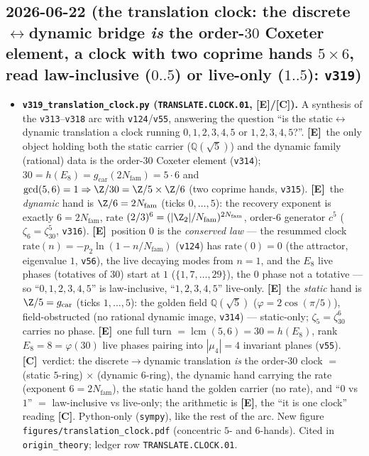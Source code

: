 \documentclass[11pt]{article}
\providecommand{\mE}{\textbf{[E]}}\providecommand{\mC}{\textbf{[C]}}
\providecommand{\gcar}{g_{\mathrm{car}}}\providecommand{\Nfam}{N_{\mathrm{fam}}}
\begin{document}
\subsection*{2026-06-22 (the translation clock: the discrete$\leftrightarrow$dynamic bridge \emph{is} the order-$30$ Coxeter element, a clock with two coprime hands $5\times6$, read law-inclusive ($0..5$) or live-only ($1..5$): \texttt{v319})}
\begin{itemize}
\item \textbf{\texttt{v319\_translation\_clock.py} (\texttt{TRANSLATE.CLOCK.01}, \mE/\mC).} A synthesis of the
  \texttt{v313}--\texttt{v318} arc with \texttt{v124}/\texttt{v55}, answering the question ``is the
  static$\leftrightarrow$dynamic translation a clock running $0,1,2,3,4,5$ or $1,2,3,4,5$?''. \mE\ the only object
  holding both the static carrier ($\mathbb Q(\sqrt5)$) and the dynamic family (rational) data is the order-$30$
  Coxeter element (\texttt{v314}); $30=h(E_8)=\gcar(2\Nfam)=5\cdot6$ and $\gcd(5,6)=1\Rightarrow\Z/30=\Z/5\times\Z/6$
  (two coprime hands, \texttt{v315}). \mE\ the \emph{dynamic} hand is $\Z/6=2\Nfam$ (ticks $0,\dots,5$): the recovery
  exponent is exactly $6=2\Nfam$, rate $(2/3)^6=(|\Z_2|/\Nfam)^{2\Nfam}$, order-$6$ generator $c^5$
  ($\zeta_6=\zeta_{30}^5$, \texttt{v316}). \mE\ position $0$ is the \emph{conserved law} --- the resummed clock
  $\mathrm{rate}(n)=-p_2\ln(1-n/\Nfam)$ (\texttt{v124}) has $\mathrm{rate}(0)=0$ (the attractor, eigenvalue $1$,
  \texttt{v56}), the live decaying modes from $n{=}1$, and the $E_8$ live phases (totatives of $30$) start at $1$
  ($\{1,7,\dots,29\}$), the $0$ phase not a totative --- so ``$0,1,2,3,4,5$'' is law-inclusive, ``$1,2,3,4,5$''
  live-only. \mE\ the \emph{static} hand is $\Z/5=\gcar$ (ticks $1,\dots,5$): the golden field $\mathbb Q(\sqrt5)$
  ($\varphi=2\cos(\pi/5)$), field-obstructed (no rational dynamic image, \texttt{v314}) --- static-only;
  $\zeta_5=\zeta_{30}^6$ carries no phase. \mE\ one full turn $=\operatorname{lcm}(5,6)=30=h(E_8)$, rank
  $E_8=8=\varphi(30)$ live phases pairing into $|\mu_4|=4$ invariant planes (\texttt{v55}). \mC\ verdict: the
  discrete$\to$dynamic translation \emph{is} the order-$30$ clock $=$ (static $5$-ring) $\times$ (dynamic $6$-ring),
  the dynamic hand carrying the rate (exponent $6=2\Nfam$), the static hand the golden carrier (no rate), and
  ``$0$ vs $1$'' $=$ law-inclusive vs live-only; the arithmetic is \mE, the ``it is one clock'' reading \mC.
  Python-only (\texttt{sympy}), like the rest of the arc. New figure \texttt{figures/translation\_clock.pdf}
  (concentric $5$- and $6$-hands). Cited in \texttt{origin\_theory}; ledger row \texttt{TRANSLATE.CLOCK.01}.
\end{itemize}
\end{document}
